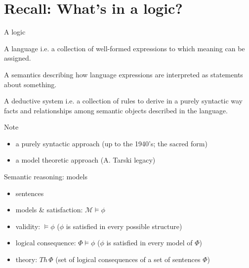 \documentclass[aspectratio=169]{beamer}
\begin{document}
\section{Recall: What's in a logic?}


\begin{slide}{A logic}\label{s:1}
\small
\begin{block}{A language}
i.e. a collection of well-formed expressions to which meaning can be assigned.
\end{block}
\begin{block}{A semantics}
describing how language expressions are interpreted as statements about something.
\end{block}
\begin{block}{A deductive system}
i.e. a collection of rules to derive in a purely syntactic way facts and relationships among semantic objects described in the language.
\end{block}

\begin{block}{Note}
\begin{itemize}
\item a purely syntactic approach (up to the 1940's; the \alert{sacred form})
\item a model theoretic approach (A. Tarski legacy)
\end{itemize}
\end{block}

\end{slide}


\newcommand{\ger}[1]{\mathcal{#1}}
\begin{slide}{Semantic reasoning: models}\label{s:2}
\small
\begin{itemize}
\item \alert{sentences}
\item \alert{models} \& \alert{satisfaction}: $\ger{M} \models \phi$
\item \alert{validity}: $\models \phi$ ($\phi$ is satisfied in every possible structure)
\item \alert{logical consequence}: $\Phi \models \phi$ ($\phi$ is satisfied in every model of $\Phi$)
\item \alert{theory}: $Th\, \Phi$ (set of logical consequences of a set of sentences $\Phi$)
\end{itemize}

\end{slide}
\end{document}
